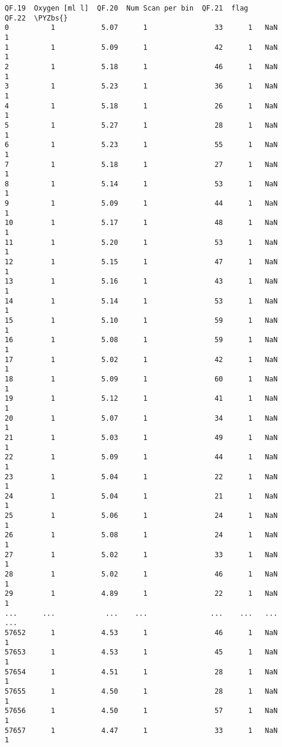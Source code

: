 \documentclass[a4paper,11pt,final]{article}
\def\PYZbs{\char`\\}
\begin{document}
\begin{Verbatim}[commandchars=\\\{\},frame=leftline,fontsize=\small, xleftmargin=0.5em]
       QF.19  Oxygen [ml l]  QF.20  Num Scan per bin  QF.21  flag
QF.22  \PYZbs{}
0          1           5.07      1                33      1   NaN
1
1          1           5.09      1                42      1   NaN
1
2          1           5.18      1                46      1   NaN
1
3          1           5.23      1                36      1   NaN
1
4          1           5.18      1                26      1   NaN
1
5          1           5.27      1                28      1   NaN
1
6          1           5.23      1                55      1   NaN
1
7          1           5.18      1                27      1   NaN
1
8          1           5.14      1                53      1   NaN
1
9          1           5.09      1                44      1   NaN
1
10         1           5.17      1                48      1   NaN
1
11         1           5.20      1                53      1   NaN
1
12         1           5.15      1                47      1   NaN
1
13         1           5.16      1                43      1   NaN
1
14         1           5.14      1                53      1   NaN
1
15         1           5.10      1                59      1   NaN
1
16         1           5.08      1                59      1   NaN
1
17         1           5.02      1                42      1   NaN
1
18         1           5.09      1                60      1   NaN
1
19         1           5.12      1                41      1   NaN
1
20         1           5.07      1                34      1   NaN
1
21         1           5.03      1                49      1   NaN
1
22         1           5.09      1                44      1   NaN
1
23         1           5.04      1                22      1   NaN
1
24         1           5.04      1                21      1   NaN
1
25         1           5.06      1                24      1   NaN
1
26         1           5.08      1                24      1   NaN
1
27         1           5.02      1                33      1   NaN
1
28         1           5.02      1                46      1   NaN
1
29         1           4.89      1                22      1   NaN
1
...      ...            ...    ...               ...    ...   ...
...
57652      1           4.53      1                46      1   NaN
1
57653      1           4.53      1                45      1   NaN
1
57654      1           4.51      1                28      1   NaN
1
57655      1           4.50      1                28      1   NaN
1
57656      1           4.50      1                57      1   NaN
1
57657      1           4.47      1                33      1   NaN
1

\end{Verbatim}
\end{document}
